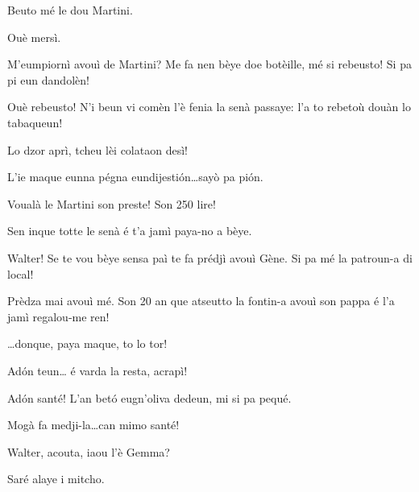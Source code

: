 \begin{drama}
\Dorinaspeaks Beuto mé le dou Martini.

\Genespeaks{} Ouè mersì.

\Walterspeaks	M'eumpiornì avouì de Martini? Me fa nen bèye doe botèille, mé si rebeusto! Si pa pi eun dandolèn!

\Genespeaks{} Ouè rebeusto! N'i beun vi comèn l'è fenia la senà passaye: l'a to rebetoù douàn lo tabaqueun!


\Genespeaks Lo dzor aprì, tcheu lèi colataon desì!

\Walterspeaks L'ie maque eunna pégna eundijesti\'on\ldots sayò pa pi\'on.


\Dorinaspeaks Voualà le Martini son preste! Son 250 lire! 

\Walterspeaks	Sen inque totte le senà é t'a  jamì paya-no a bèye.

\Dorinaspeaks{} Walter! Se te vou bèye sensa paì te fa prédjì avouì Gène. Si pa mé la patroun-a di local!


\Genespeaks Prèdza mai avouì mé.  Son 20 an que atseutto la fontin-a avouì son pappa é l'a jamì regalou-me ren!


\Genespeaks{} \ldots donque, paya maque, to lo tor!

\Walterspeaks	Ad\'on teun\ldots {} é varda la resta, acrapì!

\Selmospeaks{} Ad\'on santé! L'an bet\'o eugn'oliva dedeun, mi si pa pequé.

\Walterspeaks Mogà fa medji-la\ldots can mimo santé!




\Kettyspeaks{} Walter, acouta, iaou l'è Gemma?

 
\Walterspeaks	Saré alaye i mitcho.


\end{drama}
